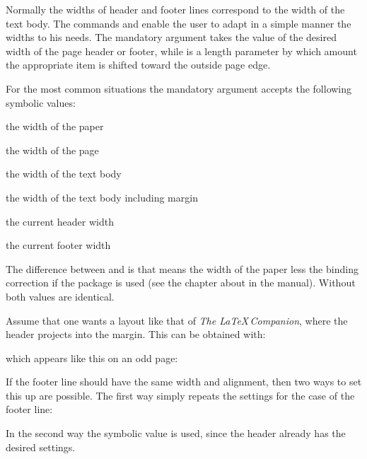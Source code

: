 \begin{Declaration}
%
\end{Declaration}%
Normally the widths of header and footer lines correspond to the width of the
text body.  The commands
 and
 enable the user to
adapt in a simple manner the widths to his needs.  The mandatory argument
 takes the value of the desired width of the page header or
footer, while  is a length parameter by which amount the
appropriate item is shifted toward the outside page edge.

For the most common situations the mandatory argument 
accepts the following symbolic values:
\begin{labeling}[\,--]{}
\item[\PValue{paper}] the width of the paper
\item[\PValue{page}] the width of the page
\item[\PValue{text}] the width of the text body
\item[\PValue{textwithmarginpar}] the width of the text body including margin
\item[\PValue{head}] the current header width
\item[\PValue{foot}] the current footer width
\end{labeling}
The difference between  and  is that 
means the width of the paper less the binding correction if the package
 is used (see the chapter about
 in the \KOMAScript{} manual). Without 
both values are identical.

\begin{Example}
  Assume that one wants a layout like that of \emph{The
    {\LaTeX}\,Companion}, where the header projects into the
  margin. This can be obtained with:
\begin{lstcode}
\end{lstcode}
%
  which appears like this on an odd page:
%
  \begin{XmpTopPage}
    \thinlines{}
  \end{XmpTopPage}
%
  If the footer line should have the same width and alignment, then two
  ways to set this up are possible. The first way simply repeats the
  settings for the case of the footer line:
\begin{lstcode}
\end{lstcode}
%
  In the second way the symbolic value  is used, since the
  header already has the desired settings.
\begin{lstcode}
\end{lstcode}
\end{Example}

